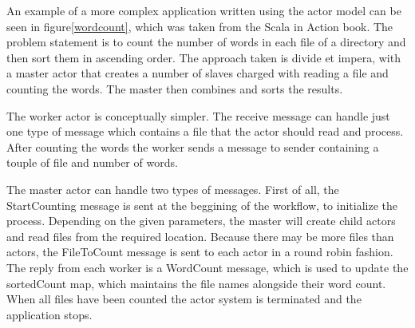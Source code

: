 \documentclass[12pt]{article}
\begin{document}
	An example of a more complex application written using the actor model can be seen 
	in figure\ref{wordcount}, which was taken from the Scala in Action book\cite{ScalaInAction}.
	The problem statement is to count the number of words in each file of a directory and 
	then sort them in ascending order. The approach taken is divide et impera, with a master actor 
	that creates a number of slaves charged with reading a file and counting the words. The master 
	then combines and sorts the results. 

	The worker actor is conceptually simpler. The receive message can handle just one type 
	of message which contains a file that the actor should read and process. After counting 
	the words the worker sends a message to sender containing a touple of file and number of 
	words.

	The master actor can handle two types of messages. First of all, the StartCounting message 
	is sent at the beggining of the workflow, to initialize the process. Depending on the given 
	parameters, the master will create child actors and read files from the required location. 
	Because there may be more files than actors, the FileToCount message is sent to each 
	actor in a round robin fashion. The reply from each worker is a WordCount message, which 
	is used to update the sortedCount map, which maintains the file names alongside their 
	word count. When all files have been counted the actor system is terminated and the application 
	stops.
\end{document}
